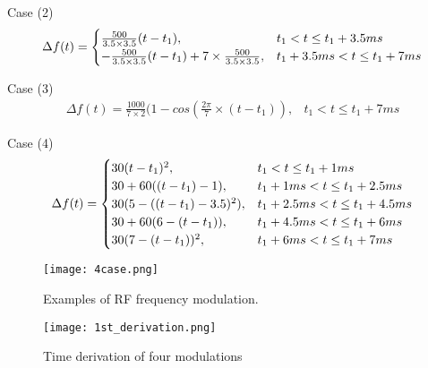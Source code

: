 Case (2)
\begin{eqnarray}\label{case2}
\Delta f(t)=
\begin{cases}
\frac {500}{3.5 \times 3.5}(t-t_1), &t_1< t\le t_1+3.5ms\cr
-\frac {500}{3.5 \times 3.5}(t-t_1) +7
\times \frac {500}{3.5 \times 3.5}, &t_1+3.5ms < t \le t_1+7ms 
\end{cases}
\end{eqnarray}

Case (3)
\begin{eqnarray}\label{case3}
\Delta f(t)=
\frac {1000}{7 \times 2} (1-cos(\frac{2\pi}{7}\times (t-t_1)), &t_1 < t\le t_1+7ms
\end{eqnarray}

Case (4)
\begin{eqnarray}\label{case4}
\Delta f(t)=
\begin{cases}
30(t-t_1)^2, &t_1< t\le t_1+1ms\cr
30+ 60((t-t_1)-1), &t_1+1ms< t\le t_1+2.5ms\cr
30(5-((t-t_1)-3.5)^2), &t_1+2.5ms< t\le t_1+4.5ms\cr

30+60(6-(t-t_1)), &t_1+4.5ms< t\le t_1+6ms\cr
30(7-(t-t_1))^2, &t_1+6ms< t\le t_1+7ms
\end{cases}
\end{eqnarray}

\begin{figure}[!htb]
   \centering   
   \texttt{[image: 4case.png]}
   \caption{Examples of RF frequency modulation.}
   \label{4case}
\end{figure}

\begin{figure}[!htb]
   \centering   
   \texttt{[image: 1st\_derivation.png]}
   \caption{Time derivation of four modulations}
   \label{1st_derivation}
\end{figure}

